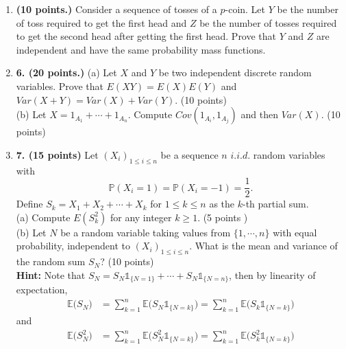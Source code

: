 \documentclass[12pt]{article}
\begin{document}
\begin{enumerate}
    \item \textbf{(10 points.)}
    Consider a sequence of tosses of a $p$-coin.
    Let $Y$ be the number of toss required to get the first head and $Z$ be the number of tosses required to get the second head after getting the first head.
    Prove that $Y$ and $Z$ are independent and have the same probability mass functions.

    \item \textbf{6. (20 points.)}
    (a) Let $X$ and $Y$ be two independent discrete random variables. Prove that $E(XY)=E(X)E(Y)$ and $Var(X+Y)=Var(X)+Var(Y)$. (10 points)\\
    (b) Let $X=1_{A_{1}}+\cdots + 1_{A_{n}}$. Compute $Cov(1_{A_{i}},1_{A_{j}})$ and then $Var(X)$. (10 points)

    \item \textbf{7. (15 points)}
    Let $(X_i)_{1\leq i\leq n}$ be a sequence $n$ $i.i.d.$ random variables with
\begin{equation*}
\mathbb{P}(X_i=1)=\mathbb{P}(X_i=-1)=\frac{1}{2}.
\end{equation*}
Define $S_k=X_1+X_2+\cdots+X_k$ for $1\leq k\leq n$ as the $k$-th partial sum.\\
(a) Compute $E(S_{k}^{2})$ for any integer $k\ge 1$. (5 points )\\
(b) Let $N$ be a random variable taking values from $\{1,\cdots,n\}$ with equal probability, independent to $(X_i)_{1\leq i\leq n}$. What is the mean  and variance of the random sum $S_{N}$?  (10 points) \\
\textbf{Hint:} Note that $S_N=S_N\mathds{1}_{\{N=1\}}+\cdots+S_N\mathds{1}_{\{N=n\}}$, then by linearity of expectation,
\begin{equation*}
\begin{aligned}
\mathbb{E}\big(S_N\big) &= \sum_{k=1}^n\mathbb{E}\big(S_N \mathds{1}_{\{N=k\}}\big)=\sum_{k=1}^n\mathbb{E}\big(S_k \mathds{1}_{\{N=k\}}\big)
\end{aligned}
\end{equation*}
and
\begin{equation*}
\begin{aligned}
\mathbb{E}\big(S_N^2\big) &= \sum_{k=1}^n\mathbb{E}\big(S_N^2\mathds{1}_{\{N=k\}}\big)=\sum_{k=1}^n\mathbb{E}\big(S_k^2\mathds{1}_{\{N=k\}}\big)
\end{aligned}
\end{equation*}

\end{enumerate}
\end{document}
